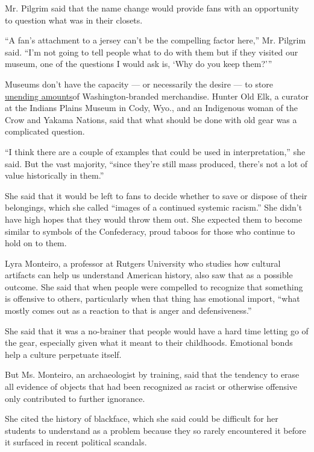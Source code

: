 Mr. Pilgrim said that the name change would provide fans with an
opportunity to question what was in their closets.

``A fan's attachment to a jersey can't be the compelling factor here,''
Mr. Pilgrim said. ``I'm not going to tell people what to do with them
but if they visited our museum, one of the questions I would ask is,
`Why do you keep them?'''

Museums don't have the capacity --- or necessarily the desire --- to
store
\href{https://www.nytimes3xbfgragh.onion/2020/07/14/arts/design/washington-football-logo-native-american.html}{unending
amounts}of Washington-branded merchandise. Hunter Old Elk, a curator at
the Indians Plains Museum in Cody, Wyo., and an Indigenous woman of the
Crow and Yakama Nations, said that what should be done with old gear was
a complicated question.

``I think there are a couple of examples that could be used in
interpretation,'' she said. But the vast majority, ``since they're still
mass produced, there's not a lot of value historically in them.''

She said that it would be left to fans to decide whether to save or
dispose of their belongings, which she called ``images of a continued
systemic racism.'' She didn't have high hopes that they would throw them
out. She expected them to become similar to symbols of the Confederacy,
proud taboos for those who continue to hold on to them.

Lyra Monteiro, a professor at Rutgers University who studies how
cultural artifacts can help us understand American history, also saw
that as a possible outcome. She said that when people were compelled to
recognize that something is offensive to others, particularly when that
thing has emotional import, ``what mostly comes out as a reaction to
that is anger and defensiveness.''

She said that it was a no-brainer that people would have a hard time
letting go of the gear, especially given what it meant to their
childhoods. Emotional bonds help a culture perpetuate itself.

But Ms. Monteiro, an archaeologist by training, said that the tendency
to erase all evidence of objects that had been recognized as racist or
otherwise offensive only contributed to further ignorance.

She cited the history of blackface, which she said could be difficult
for her students to understand as a problem because they so rarely
encountered it before it surfaced in recent political scandals.

